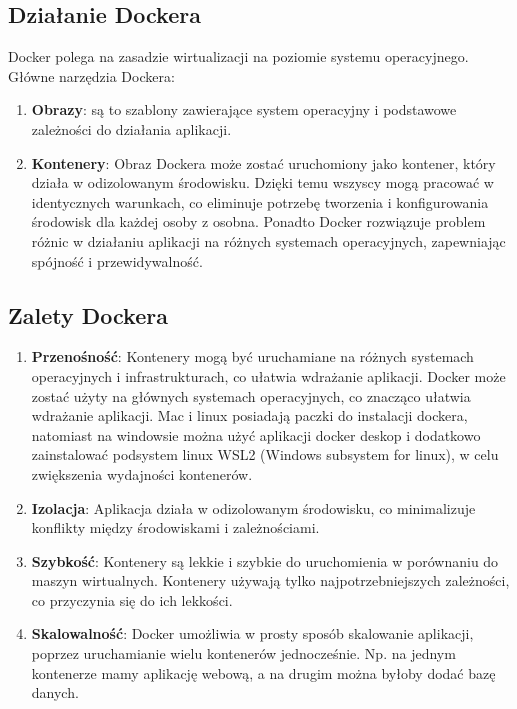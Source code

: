 \subsection{Działanie Dockera}
Docker polega na zasadzie wirtualizacji na poziomie systemu operacyjnego. Główne narzędzia Dockera:
\begin{enumerate}
    \item \textbf{Obrazy}: są to szablony zawierające system operacyjny i podstawowe zależności do działania aplikacji.
    \item \textbf{Kontenery}:
    Obraz Dockera może zostać uruchomiony jako kontener, który działa w odizolowanym środowisku. Dzięki temu wszyscy mogą pracować w identycznych warunkach, co eliminuje potrzebę tworzenia i konfigurowania środowisk dla każdej osoby z osobna. Ponadto Docker rozwiązuje problem różnic w działaniu aplikacji na różnych systemach operacyjnych, zapewniając spójność i przewidywalność.
\end{enumerate}

\subsection{Zalety Dockera}
\begin{enumerate}
    \item \textbf{Przenośność}: Kontenery mogą być uruchamiane na różnych systemach operacyjnych i infrastrukturach, co ułatwia wdrażanie aplikacji.
    Docker może zostać użyty na głównych systemach operacyjnych, co znacząco ułatwia wdrażanie aplikacji. Mac i linux posiadają paczki do instalacji dockera, natomiast na windowsie można użyć aplikacji docker deskop i dodatkowo zainstalować podsystem linux WSL2 (Windows subsystem for linux), w celu zwiększenia wydajności kontenerów.
    \item \textbf{Izolacja}:
    Aplikacja działa w odizolowanym środowisku, co minimalizuje konflikty między środowiskami i zależnościami.
    \item \textbf{Szybkość}:
    Kontenery są lekkie i szybkie do uruchomienia w porównaniu do maszyn wirtualnych. Kontenery używają tylko najpotrzebniejszych zależności, co przyczynia się do ich lekkości.
    \item \textbf{Skalowalność}: Docker umożliwia w prosty sposób skalowanie aplikacji, poprzez uruchamianie wielu kontenerów jednocześnie. Np. na jednym kontenerze mamy aplikację webową, a na drugim można byłoby dodać bazę danych.
\end{enumerate}
